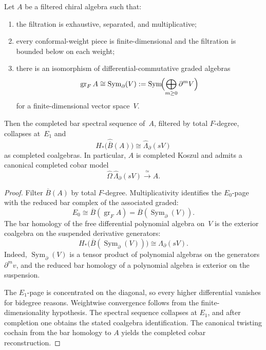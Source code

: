 \begin{theorem}
\label{thm:w-pbw-slodowy-collapse}
Let $A$ be a filtered chiral algebra such that:
\begin{enumerate}[label=\textup{(\roman*)}]
\item the filtration is exhaustive, separated, and multiplicative;
\item every conformal-weight piece is finite-dimensional and the
filtration is bounded below on each weight;
\item there is an isomorphism of differential-commutative graded
algebras
\[
\operatorname{gr}_F A
\cong \operatorname{Sym}_\partial(V)
:= \operatorname{Sym}\!\Bigl(
   \bigoplus_{m \ge 0}\partial^m V\Bigr)
\]
for a finite-dimensional vector space~$V$.
\end{enumerate}
Then the completed bar spectral sequence of~$A$, filtered by total
$F$-degree, collapses at~$E_1$ and
\[
H_*\!\bigl(\widehat{\overline{B}}(A)\bigr)
\cong \widehat{\Lambda}_\partial(sV)
\]
as completed coalgebras.  In particular, $A$ is completed Koszul and
admits a canonical completed cobar model
\[
\widehat{\Omega}\,\widehat{\Lambda}_\partial(sV)
\xrightarrow{\;\simeq\;} A.
\]
\end{theorem}

\begin{proof}
Filter $\overline{B}(A)$ by total $F$-degree.  Multiplicativity
identifies the $E_0$-page with the reduced bar complex of the
associated graded:
\[
E_0 \cong \overline{B}(\operatorname{gr}_F A)
= \overline{B}(\operatorname{Sym}_\partial(V)).
\]
The bar homology of the free differential polynomial algebra on~$V$
is the exterior coalgebra on the suspended derivative generators:
\[
H_*\!\bigl(\overline{B}(\operatorname{Sym}_\partial(V))\bigr)
\cong \Lambda_\partial(sV).
\]
Indeed, $\operatorname{Sym}_\partial(V)$ is a tensor product of
polynomial algebras on the generators $\partial^m v$, and the reduced
bar homology of a polynomial algebra is exterior on the suspension.

The $E_1$-page is concentrated on the diagonal, so every higher
differential vanishes for bidegree reasons.  Weightwise convergence
follows from the finite-dimensionality hypothesis.  The spectral
sequence collapses at $E_1$, and after completion one obtains the
stated coalgebra identification.  The canonical twisting cochain from
the bar homology to $A$ yields the completed cobar
reconstruction.
\end{proof}

